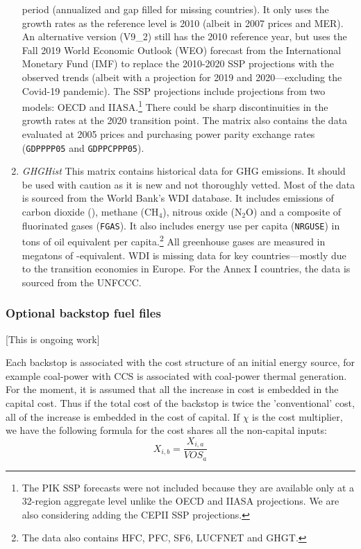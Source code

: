 \begin{enumerate}
period (annualized and gap filled for missing countries). It only uses
the growth rates as the reference level is 2010 (albeit in 2007 prices
and MER). An alternative version (V9\_2) still has the 2010 reference
year, but uses the Fall 2019 World Economic Outlook (WEO) forecast from
the International Monetary Fund (IMF) to replace the 2010-2020 SSP
projections with the observed trends (albeit with a projection for 2019
and 2020---excluding the Covid-19 pandemic). The SSP projections
include projections from two models: OECD and IIASA.\footnote{The PIK SSP forecasts
were not included because they are available only at a 32-region aggregate
level unlike the OECD and IIASA projections. We are also considering
adding the CEPII SSP projections.} There could be sharp
discontinuities in the growth rates at the 2020 transition
point. The matrix also contains the data
evaluated at 2005 prices and purchasing power parity exchange rates
(\texttt{GDPPPP05} and \texttt{GDPPCPPP05}).
\item \emph{GHGHist} This matrix contains historical data for GHG emissions.
It should be used with caution as it is new and not thoroughly vetted.
Most of the data is sourced from the World Bank's WDI database. It includes
emissions of carbon dioxide (\COT{}), methane ($\textrm{CH}_4$),
nitrous oxide ($\textrm{N}_2\textrm{O}$) and a composite of
fluorinated gases (\texttt{FGAS}). It also includes
energy use per capita (\texttt{NRGUSE}) in tons of oil equivalent
per capita.\footnote{The data also contains HFC, PFC, SF6, LUCFNET
and GHGT.} All greenhouse gases are measured in megatons of
\COT{}-equivalent. WDI is missing data for key countries---mostly
due to the transition economies in Europe. For the Annex I
countries, the data is sourced from the UNFCCC.
\end{enumerate}

\subsubsection{Optional backstop fuel files}

[This is ongoing work]

Each backstop is associated with the cost structure of an initial energy source,
for example coal-power with CCS is associated with coal-power thermal
generation. For the moment, it is assumed that all the increase in cost
is embedded in the capital cost. Thus if the total cost
of the backstop is twice the 'conventional' cost, all of the increase
is embedded in the cost of capital. If $\chi$ is the cost multiplier,
we have the following formula for the cost shares all the non-capital inputs:
\[
X_{i,b} = \frac{X_{i,a}} { \mathit{VOS}_{a}}
\]

